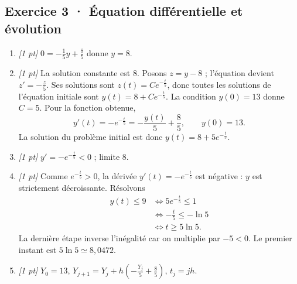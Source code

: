 \subsection*{Exercice 3 · Équation différentielle et évolution}\begin{enumerate}

\item \textit{[1 pt]} $0=-\frac{1}{5}y+\frac{8}{5}$ donne $y=8$.

\item \textit{[1 pt]} La solution constante est $8$. Posons $z=y-8$ ; l'équation devient $z'=-\frac{z}{5}$. Ses solutions sont $z(t)=Ce^{-\frac{t}{5}}$, donc toutes les solutions de l'équation initiale sont $y(t)=8+Ce^{-\frac{t}{5}}$.
La condition $y(0)=13$ donne $C=5$. Pour la fonction obtenue,
\[y'(t)=-e^{-\frac{t}{5}}=-\frac{y(t)}{5}+\frac{8}{5},\qquad y(0)=13.\]
La solution du problème initial est donc $y(t)=8+5e^{-\frac{t}{5}}$.

\item \textit{[1 pt]} $y'=-e^{-\frac{t}{5}}<0$ ; limite $8$.

\item \textit{[1 pt]} Comme $e^{-\frac{t}{5}}>0$, la dérivée $y'(t)=-e^{-\frac{t}{5}}$ est négative : $y$ est strictement décroissante. Résolvons
\[\begin{aligned}y(t)\le 9&\Longleftrightarrow 5e^{-\frac{t}{5}}\le1\\&\Longleftrightarrow -\frac{t}{5}\le-\ln 5\\&\Longleftrightarrow t\ge 5\ln 5.\end{aligned}\]
La dernière étape inverse l'inégalité car on multiplie par $-5<0$. Le premier instant est $5\ln 5\simeq8{,}0472$.

\item \textit{[1 pt]} $Y_0=13$, $Y_{j+1}=Y_j+h(-\frac{Y_j}{5}+\frac{8}{5})$, $t_j=jh$.

\end{enumerate}

